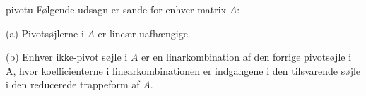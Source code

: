 \begin{thm}{}{pivotu}
Følgende udsagn er sande for enhver matrix $A$: 
\itemize 
\item (a) Pivotsøjlerne i $A$ er lineær uafhængige. 
\item (b) Enhver ikke-pivot søjle i $A$ er en linarkombination af den forrige pivotsøjle i A, hvor koefficienterne i linearkombinationen er indgangene i den tilsvarende søjle i den reducerede trappeform af $A$. 
\end{thm}